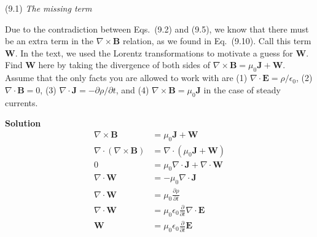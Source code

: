 \documentclass{article}
\begin{document}
\maketitle
\newpage





\begin{homeworkProblem}
	(9.1) \textit{The missing term}

	Due to the contradiction between Eqs.~(9.2) and (9.5), we know that there must be an extra term in the $\nabla\times\mathbf{B}$ relation, as we found in Eq.~(9.10). Call this term $\mathbf{W}$. In the text, we used the Lorentz transformations to motivate a guess for $\mathbf{W}$. Find $\mathbf{W}$ here by taking the divergence of both sides of $\nabla\times\mathbf{B}=\mu_0\mathbf{J}+\mathbf{W}$. Assume that the only facts you are allowed to work with are (1) $\nabla\cdot\mathbf{E}=\rho/\epsilon_0$, (2) $\nabla\cdot\mathbf{B}=0$, (3) $\nabla\cdot\mathbf{J}=-\partial\rho/\partial t$, and (4) $\nabla\times\mathbf{B}=\mu_0\mathbf{J}$ in the case of steady currents.

	\textbf{Solution}
	\begin{align*}
		\nabla\times\mathbf{B}&=\mu_0\mathbf{J}+\mathbf{W} \\
		\nabla\cdot\left(\nabla\times\mathbf{B}\right)&=\nabla\cdot\left(\mu_0\mathbf{J}+\mathbf{W}\right) \\
		0&=\mu_0\nabla\cdot\mathbf{J}+\nabla\cdot\mathbf{W} \\
		\nabla\cdot\mathbf{W}&=-\mu_0\nabla\cdot\mathbf{J} \\
		\nabla\cdot\mathbf{W}&=\mu_0\frac{\partial\rho}{\partial t} \\
		\nabla\cdot\mathbf{W}&=\mu_0\epsilon_0\frac{\partial}{\partial t}\nabla\cdot\mathbf{E} \\
		\mathbf{W}&=\mu_0\epsilon_0\frac{\partial}{\partial t}\mathbf{E} \\
	\end{align*}
\end{homeworkProblem}
\end{document}
